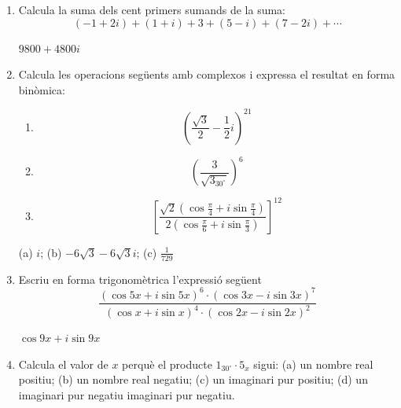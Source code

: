 \begin{enumerate}
\begin{enumerate}
\item[a)]
\[
z_{1}=\frac{(1+i)^{5}}{(1-i)^{3}}
\]

\item[b)]
\[
z_{2}=3\left( \cos \frac{3\pi }{2}+i\sin \frac{3\pi }{2}\right) ^{10}
\]
\end{enumerate}

\begin{indicacio}
(a) $\left\vert z_{1}\right\vert =2$ i $\arg (z_{1})=0$; (b) $
\left\vert z_{2}\right\vert =3$ i $\arg (z_{2})=\pi $
\end{indicacio}

\item Calcula la suma dels cent primers sumands de la suma:
\[
(-1+2i)+(1+i)+3+(5-i)+(7-2i)+\cdots
\]

\begin{indicacio}
$9800+4800i$
\end{indicacio}

\item Calcula les operacions següents amb complexos i expressa el
resultat en forma binòmica:

\begin{enumerate}
\item[a)]
\[
\left( \frac{\sqrt{3}}{2}-\frac{1}{2}i\right) ^{21}
\]

\item[b)]
\[
\left( \frac{3}{\sqrt{3_{30
^{\circ}
}}}\right) ^{6}
\]

\item[c)]
\[
\left[ \frac{\sqrt{2}\left( \cos \frac{\pi }{4}+i\sin \frac{\pi }{4}\right)
}{2\left( \cos \frac{\pi }{6}+i\sin \frac{\pi }{3}\right) }\right] ^{12}
\]
\end{enumerate}

\begin{indicacio}
(a) $i$; (b) $-6\sqrt{3}-6\sqrt{3}i$; (c) $\frac{1}{729}$
\end{indicacio}

\item Escriu en forma trigonomètrica l’expressió següent
\[
\frac{(\cos 5x+i\sin 5x)^{6}\cdot (\cos 3x-i\sin 3x)^{7}}{(\cos x+i\sin
x)^{4}\cdot (\cos 2x-i\sin 2x)^{2}}
\]

\begin{indicacio}
$\cos 9x+i\sin 9x$
\end{indicacio}

\item Calcula el valor de $x$ perquè el producte $1_{30
^{\circ}
}\cdot 5_{x}$ sigui: (a) un nombre real positiu; (b) un nombre real
negatiu; (c) un imaginari pur positiu; (d) un imaginari pur negatiu
imaginari pur negatiu.


\end{enumerate}
